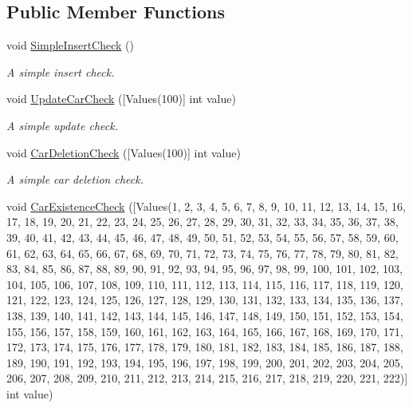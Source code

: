 \subsection*{Public Member Functions}
\begin{DoxyCompactItemize}
\item 
void \mbox{\hyperlink{class_car_shop_1_1_logic_1_1_tests_1_1_logic_test_ab4e6c26ad9e6ba7b68eefa5aba8cff92}{Simple\+Insert\+Check}} ()
\begin{DoxyCompactList}\small\item\em A simple insert check. \end{DoxyCompactList}\item 
void \mbox{\hyperlink{class_car_shop_1_1_logic_1_1_tests_1_1_logic_test_a76aef8798947707c11b898f268f1a121}{Update\+Car\+Check}} (\mbox{[}Values(100)\mbox{]} int value)
\begin{DoxyCompactList}\small\item\em A simple update check. \end{DoxyCompactList}\item 
void \mbox{\hyperlink{class_car_shop_1_1_logic_1_1_tests_1_1_logic_test_a16f135dd6a77ba37e73ca87bb2c510fe}{Car\+Deletion\+Check}} (\mbox{[}Values(100)\mbox{]} int value)
\begin{DoxyCompactList}\small\item\em A simple car deletion check. \end{DoxyCompactList}\item 
void \mbox{\hyperlink{class_car_shop_1_1_logic_1_1_tests_1_1_logic_test_a54d99bee5812656565ff5cc5ac79d8b9}{Car\+Existence\+Check}} (\mbox{[}Values(1, 2, 3, 4, 5, 6, 7, 8, 9, 10, 11, 12, 13, 14, 15, 16, 17, 18, 19, 20, 21, 22, 23, 24, 25, 26, 27, 28, 29, 30, 31, 32, 33, 34, 35, 36, 37, 38, 39, 40, 41, 42, 43, 44, 45, 46, 47, 48, 49, 50, 51, 52, 53, 54, 55, 56, 57, 58, 59, 60, 61, 62, 63, 64, 65, 66, 67, 68, 69, 70, 71, 72, 73, 74, 75, 76, 77, 78, 79, 80, 81, 82, 83, 84, 85, 86, 87, 88, 89, 90, 91, 92, 93, 94, 95, 96, 97, 98, 99, 100, 101, 102, 103, 104, 105, 106, 107, 108, 109, 110, 111, 112, 113, 114, 115, 116, 117, 118, 119, 120, 121, 122, 123, 124, 125, 126, 127, 128, 129, 130, 131, 132, 133, 134, 135, 136, 137, 138, 139, 140, 141, 142, 143, 144, 145, 146, 147, 148, 149, 150, 151, 152, 153, 154, 155, 156, 157, 158, 159, 160, 161, 162, 163, 164, 165, 166, 167, 168, 169, 170, 171, 172, 173, 174, 175, 176, 177, 178, 179, 180, 181, 182, 183, 184, 185, 186, 187, 188, 189, 190, 191, 192, 193, 194, 195, 196, 197, 198, 199, 200, 201, 202, 203, 204, 205, 206, 207, 208, 209, 210, 211, 212, 213, 214, 215, 216, 217, 218, 219, 220, 221, 222)\mbox{]} int value)

\end{DoxyCompactItemize}
